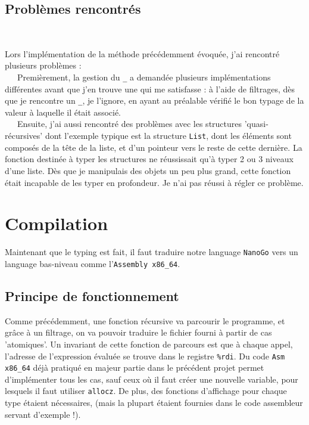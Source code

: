 \documentclass[11pt,a4paper]{article}
\begin{document}
\subsection{Problèmes rencontrés} \

Lors l'implémentation de la méthode précédemment évoquée, j'ai rencontré plusieurs problèmes : \\

\ \ \ Premièrement, la gestion du \verb|_| a demandée plusieurs implémentations différentes avant que j'en trouve une qui me satisfasse : à l'aide de filtrages, dès que je rencontre un \verb|_|, je l'ignore, en ayant au préalable vérifié le bon typage de la valeur à laquelle il était associé. \\ 

\ \ \ Ensuite, j'ai aussi rencontré des problèmes avec les structures 'quasi-récursives' dont l'exemple typique est la structure \verb|List|, dont les éléments sont composés de la tête de la liste, et d'un pointeur vers le reste de cette dernière. La fonction destinée à typer les structures ne réussissait qu'à typer 2 ou 3 niveaux d'une liste. Dès que je manipulais des objets un peu plus grand, cette fonction était incapable de les typer en profondeur. Je n'ai pas réussi à régler ce problème. \\

\section{Compilation}

	Maintenant que le typing est fait, il faut traduire notre language \verb|NanoGo| vers un language bas-niveau comme l'\verb|Assembly x86_64|.  

\subsection{Principe de fonctionnement}

Comme précédemment, une fonction récursive va parcourir le programme, et grâce à un filtrage, on va pouvoir traduire le fichier fourni à partir de cas 'atomiques'. Un invariant de cette fonction de parcours est que à chaque appel, l'adresse de l'expression évaluée se trouve dans le registre \verb|%rdi|. Du code \verb|Asm x86_64| déjà pratiqué en majeur partie dans le précédent projet permet d'implémenter tous les cas, sauf ceux où il faut créer une nouvelle variable, pour lesquels il faut utiliser \verb|allocz|. De plus, des fonctions d'affichage pour chaque type étaient nécessaires, (mais la plupart étaient fournies dans le code assembleur servant d'exemple !).
\end{document}
